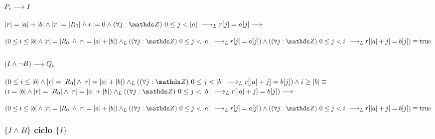 \documentclass{article}
\begin{document}
\subsubsection*{$P_{c} \longrightarrow I$}
$\longitud{r} = \longitud{a} + \longitud{b} \wedge \longitud{r} = \longitud{R_{0}} \wedge i:= 0 \wedge \paraTodo{j}{0}{\longitud{a}} \implicaLuego r[j]=a[j] \implica$

$(0 \leq i \leq \longitud{b} \wedge \longitud{r} = \longitud{R_{0}} \wedge \longitud{r} = \longitud{a} + \longitud{b}) \yLuego (\paraTodo{j}{0}{\longitud{a}} \implicaLuego r[j] = a[j]) \wedge (\paraTodo{j}{0}{i} \implicaLuego r[\longitud{a}+j]=b[j]) \equiv \True$

\subsubsection*{$(I \wedge \neg B) \longrightarrow Q_{c}$}
$(0 \leq i \leq \longitud{b} \wedge \longitud{r} = \longitud{R_{0}} \wedge \longitud{r} = \longitud{a} + \longitud{b}) \yLuego (\paraTodo{j}{0}{\longitud{b}} \implicaLuego r[\longitud{a}+j]=b[j]) \wedge i \geq \longitud{b} \equiv$\\

$(i = \longitud{b} \wedge \longitud{r} = \longitud{R_{0}} \wedge \longitud{r} = \longitud{a} + \longitud{b}) \yLuego (\paraTodo{j}{0}{\longitud{b}} \implicaLuego r[\longitud{a}+j]=b[j]) \implica$

$(0 \leq i \leq \longitud{b} \wedge \longitud{r} = \longitud{R_{0}} \wedge \longitud{r} = \longitud{a} + \longitud{b}) \yLuego (\paraTodo{j}{0}{\longitud{a}} \implicaLuego r[j] = a[j]) \wedge (\paraTodo{j}{0}{i} \implicaLuego r[\longitud{a}+j]=b[j]) \equiv \True$

\subsubsection*{$\{I \wedge B\}$ ciclo $\{ I \}$}
\end{document}
